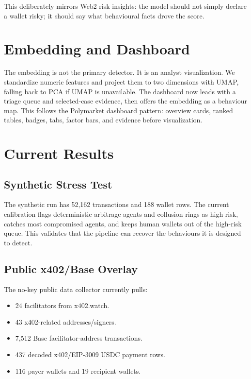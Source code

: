 \documentclass[11pt]{article}
\begin{document}
This deliberately mirrors Web2 risk insights: the model should not simply
declare a wallet risky; it should say what behavioural facts drove the score.

\section{Embedding and Dashboard}

The embedding is not the primary detector.  It is an analyst visualization.
We standardize numeric features and project them to two dimensions with UMAP,
falling back to PCA if UMAP is unavailable.  The dashboard now leads with a
triage queue and selected-case evidence, then offers the embedding as a
behaviour map.  This follows the Polymarket dashboard pattern: overview cards,
ranked tables, badges, tabs, factor bars, and evidence before visualization.

\section{Current Results}

\subsection{Synthetic Stress Test}

The synthetic run has 52,162 transactions and 188 wallet rows.  The current
calibration flags deterministic arbitrage agents and collusion rings as high
risk, catches most compromised agents, and keeps human wallets out of the
high-risk queue.  This validates that the pipeline can recover the behaviours
it is designed to detect.

\subsection{Public x402/Base Overlay}

The no-key public data collector currently pulls:

\begin{itemize}
  \item 24 facilitators from x402.watch.
  \item 43 x402-related addresses/signers.
  \item 7,512 Base facilitator-address transactions.
  \item 437 decoded x402/EIP-3009 USDC payment rows.
  \item 116 payer wallets and 19 recipient wallets.
\end{itemize}
\end{document}
